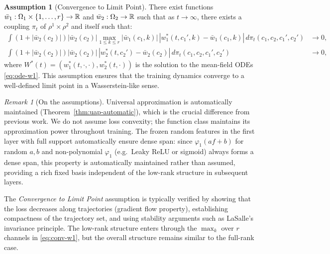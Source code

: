 \documentclass[nohyperref]{article}
\theoremstyle{plain}
\theoremstyle{definition}
\newtheorem{assumption}[theorem]{Assumption}
\theoremstyle{remark}
\newtheorem{remark}[theorem]{Remark}
\begin{document}
\begin{assumption}[Convergence to Limit Point]
\label{assump:convergence}
There exist functions $\bar{w}_1:\Omega_1\times\{1,\dots,r\}\to\R$ and $\bar{w}_2:\Omega_2\to\R$ such that as $t\to\infty$, there exists a coupling $\pi_t$ of $\rho^1\times\rho^2$ and itself such that:
\begin{align}
\int (1+|\bar{w}_2(c_2)|)|\bar{w}_2(c_2)|\max_{1\le k\le r}|\bar{w}_1(c_1,k)|\,|w_1^*(t,c_1',k)-\bar{w}_1(c_1,k)|\,d\pi_t(c_1,c_2,c_1',c_2') &\to 0, \label{eq:conv-w1}\\
\int (1+|\bar{w}_2(c_2)|)|\bar{w}_2(c_2)|\,|w_2^*(t,c_2')-\bar{w}_2(c_2)|\,d\pi_t(c_1,c_2,c_1',c_2') &\to 0, \label{eq:conv-w2}
\end{align}
where $W^*(t)=(w_1^*(t,\cdot,\cdot),w_2^*(t,\cdot))$ is the solution to the mean-field ODEs \eqref{eq:ode-w1}. This assumption ensures that the training dynamics converge to a well-defined limit point in a Wasserstein-like sense.
\end{assumption}

\begin{remark}[On the assumptions]
Universal approximation is automatically maintained (Theorem~\ref{thm:uap-automatic}), which is the crucial difference from previous work. We do not assume loss convexity; the function class maintains its approximation power throughout training. The frozen random features in the first layer with full support automatically ensure dense span: since $\varphi_1(af+b)$ for random $a,b$ and non-polynomial $\varphi_1$ (e.g.\ Leaky ReLU or sigmoid) always forms a dense span, this property is automatically maintained rather than assumed, providing a rich fixed basis independent of the low-rank structure in subsequent layers.

The \emph{Convergence to Limit Point} assumption is typically verified by showing that the loss decreases along trajectories (gradient flow property), establishing compactness of the trajectory set, and using stability arguments such as LaSalle's invariance principle. The low-rank structure enters through the $\max_k$ over $r$ channels in \eqref{eq:conv-w1}, but the overall structure remains similar to the full-rank case.
\end{remark}
\end{document}
